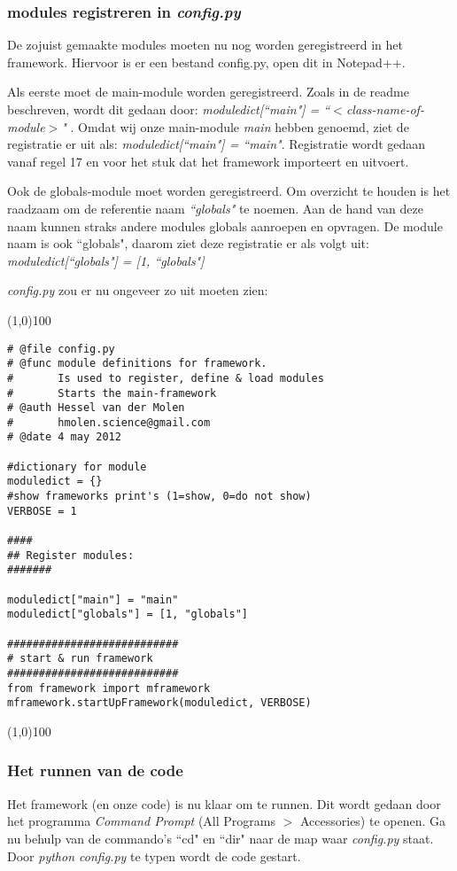 \documentclass[a4paper]{article}
\begin{document}
\subsubsection{modules registreren in \textit{config.py}}
De zojuist gemaakte modules moeten nu nog worden geregistreerd in het framework. Hiervoor is er een bestand config.py, open dit in Notepad++.

Als eerste moet de main-module worden geregistreerd. Zoals in de readme beschreven, wordt dit gedaan door:
 \textit{moduledict[``main"] = ``$<$class-name-of-module$>$" }. 
Omdat wij onze main-module \textit{main} hebben genoemd, ziet de registratie er uit als: \textit{moduledict[``main"] = ``main"}.
Registratie wordt gedaan vanaf regel 17 en voor het stuk dat het framework importeert en uitvoert.

Ook de globals-module moet worden geregistreerd. Om overzicht te houden is het raadzaam om de referentie naam \textit{``globals"} te noemen. Aan de hand van deze naam kunnen straks andere modules globals aanroepen en opvragen. De module naam is ook ``globals", daarom ziet deze registratie er als volgt uit: \textit{moduledict[``globals"] = [1, ``globals"]}

\textit{config.py} zou er nu ongeveer zo uit moeten zien:

\noindent \line(1,0){100}
\begin{verbatim}
# @file config.py
# @func module definitions for framework. 
#       Is used to register, define & load modules 
#       Starts the main-framework
# @auth Hessel van der Molen
#       hmolen.science@gmail.com
# @date 4 may 2012

#dictionary for module
moduledict = {}
#show frameworks print's (1=show, 0=do not show)
VERBOSE = 1

####
## Register modules:
#######

moduledict["main"] = "main"
moduledict["globals"] = [1, "globals"]

###########################
# start & run framework
###########################
from framework import mframework
mframework.startUpFramework(moduledict, VERBOSE)
\end{verbatim}
\noindent \line(1,0){100}

\subsubsection{Het runnen van de code}
Het framework (en onze code) is nu klaar om te runnen. Dit wordt gedaan door het programma \textit{Command Prompt} (All Programs $>$ Accessories) te openen. 
Ga nu behulp van de commando's ``cd"  en ``dir" naar de map waar \textit{config.py} staat.
Door \textit{python config.py} te typen wordt de code gestart.
\end{document}
